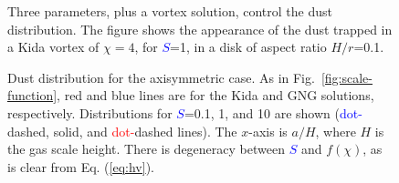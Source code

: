 \documentclass[apj]{emulateapj}
\def\blue#1{\textcolor{blue}{#1}}
\def\red#1{\textcolor{red}{#1}}
\newcommand{\Eq}[1]{Eq. (\ref{#1})}
\newcommand{\eq}[1]{\Eq{#1}}
\newcommand{\Fig}[1]{Fig.~\ref{#1}}
\newcommand{\fig}[1]{\Fig{#1}}
\begin{document}
\begin{figure}
\begin{center}
 \end{center}
\caption[]{Three parameters, plus a vortex solution, control the dust distribution. 
The figure shows the appearance of the dust trapped in a Kida vortex of $\chi=4$, 
for \blue{$S$}=1, in a disk of aspect ratio $H/r$=0.1.}
 \label{fig:disk}
\end{figure}

\begin{figure}
  \begin{center}
  \end{center}
\caption[]{Dust distribution for the axisymmetric case. As in
  \fig{fig:scale-function}, red and blue lines are for the Kida and
  GNG solutions, respectively. Distributions for \blue{$S$}=0.1, 1, and
  10 are shown (\blue{dot-}dashed, solid, and \red{dot-}dashed lines). The $x$-axis is
  $a/H$, where $H$ is the gas scale height. There is degeneracy
  between \blue{$S$} and $f(\chi)$, as is clear from \eq{eq:hv}.}
 \label{fig:gaussian}
\end{figure}
\end{document}
